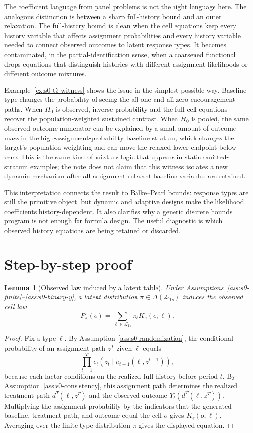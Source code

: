 \documentclass[11pt]{article}
\theoremstyle{definition}
\theoremstyle{plain}
\newtheorem{lemma}{Lemma}
\theoremstyle{remark}
\begin{document}
The coefficient language from panel problems is not the right language here.  The analogous distinction is between a sharp full-history bound and an outer relaxation.  The full-history bound is clean when the cell equations keep every history variable that affects assignment probabilities and every history variable needed to connect observed outcomes to latent response types.  It becomes contaminated, in the partial-identification sense, when a coarsened functional drops equations that distinguish histories with different assignment likelihoods or different outcome mixtures.

Example~\ref{ex:s0-t3-witness} shows the issue in the simplest possible way.  Baseline type changes the probability of seeing the all-one and all-zero encouragement paths.  When \(H_0\) is observed, inverse probability and the full cell equations recover the population-weighted sustained contrast.  When \(H_0\) is pooled, the same observed outcome numerator can be explained by a small amount of outcome mass in the high-assignment-probability baseline stratum, which changes the target's population weighting and can move the relaxed lower endpoint below zero.  This is the same kind of mixture logic that appears in static omitted-stratum examples; the note does not claim that this witness isolates a new dynamic mechanism after all assignment-relevant baseline variables are retained.

This interpretation connects the result to Balke--Pearl bounds: response types are still the primitive object, but dynamic and adaptive designs make the likelihood coefficients history-dependent.  It also clarifies why a generic discrete bounds program is not enough for formula design.  The useful diagnostic is which observed history equations are being retained or discarded.

\section{Step-by-step proof}
\begin{lemma}[Observed law induced by a latent table]\label{lem:s0-induced-law}
Under Assumptions~\ref{ass:s0-finite}--\ref{ass:s0-binary-y}, a latent distribution \(\pi\in\Delta(\mathcal L_{1s})\) induces the observed cell law
\[
P_\pi(o)=\sum_{\ell\in\mathcal L_{1s}}\pi_\ell K_e(o,\ell).
\]
\end{lemma}

\begin{proof}
Fix a type \(\ell\).  By Assumption~\ref{ass:s0-randomization}, the conditional probability of an assignment path \(z^T\) given \(\ell\) equals
\[
\prod_{t=1}^T e_t(z_t\mid h_{t-1}(\ell,z^{t-1})),
\]
because each factor conditions on the realized full history before period \(t\).  By Assumption~\ref{ass:s0-consistency}, this assignment path determines the realized treatment path \(d^T(\ell,z^T)\) and the observed outcome \(Y_\ell(d^T(\ell,z^T))\).  Multiplying the assignment probability by the indicators that the generated baseline, treatment path, and outcome equal the cell \(o\) gives \(K_e(o,\ell)\).  Averaging over the finite type distribution \(\pi\) gives the displayed equation.
\end{proof}
\end{document}
